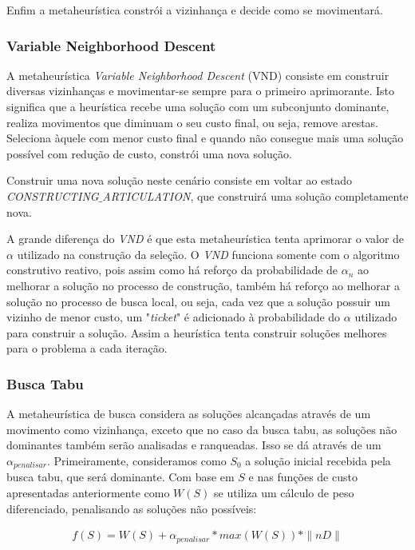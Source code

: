 \documentclass[conference,compsoc]{IEEEtran}
\begin{document}
Enfim a metaheurística constrói a vizinhança e decide como se movimentará.

\subsubsection{Variable Neighborhood Descent}

A metaheurística \textit{Variable Neighborhood Descent} (VND) consiste em construir diversas vizinhanças e movimentar-se sempre para o primeiro aprimorante. Isto significa que a heurística recebe uma solução com um subconjunto dominante, realiza movimentos que diminuam o seu custo final, ou seja, remove arestas. Seleciona àquele com menor custo final e quando não consegue mais uma solução possível com redução de custo, constrói uma nova solução.

Construir uma nova solução neste cenário consiste em voltar ao estado \textit{CONSTRUCTING$\_$ARTICULATION}, que construirá uma solução completamente nova.

A grande diferença do \textit{VND} é que esta metaheurística tenta aprimorar o valor de $\alpha$ utilizado na construção da seleção. O \textit{VND} funciona somente com o algoritmo construtivo reativo, pois assim como há reforço da probabilidade de $\alpha_n$ ao melhorar a solução no processo de construção, também há reforço ao melhorar a solução no processo de busca local, ou seja, cada vez que a solução possuir um vizinho de menor custo, um "\textit{ticket}" é adicionado à probabilidade do $\alpha$ utilizado para construir a solução. Assim a heurística tenta construir soluções melhores para o problema a cada iteração.

\subsubsection{Busca Tabu}

A metaheurística de busca considera as soluções alcançadas através de um movimento como vizinhança, exceto que no caso da busca tabu, as soluções não dominantes também serão analisadas e ranqueadas. Isso se dá através de um $\alpha_{penalisar}$. Primeiramente, consideramos como $S_0$ a solução inicial recebida pela busca tabu, que será dominante. Com base em $S$ e nas funções de custo apresentadas anteriormente como $W(S)$ se utiliza um cálculo de peso diferenciado, penalisando as soluções não possíveis:

\begin{eqnarray*}
    f(S) = W(S) + \alpha_{penalisar} * max(W(S)) * \| nD \|
    \label{01_min}
\end{eqnarray*}
\end{document}
